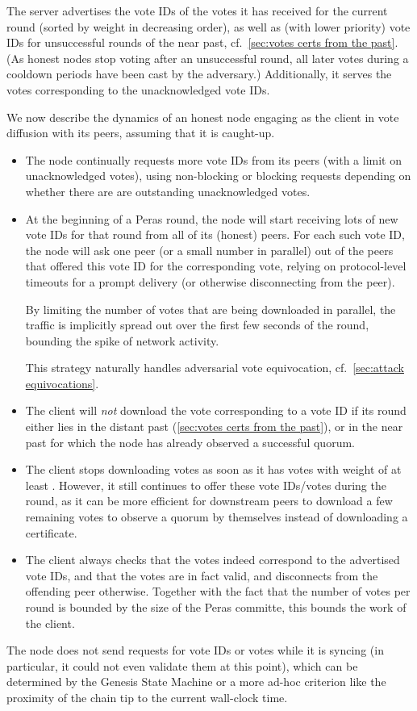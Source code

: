 The server advertises the vote IDs of the votes it has received for the current round (sorted by weight in decreasing order), as well as (with lower priority) vote IDs for unsuccessful rounds of the near past, cf.~\cref{sec:votes certs from the past}.
(As honest nodes stop voting after an unsuccessful round, all later votes during a cooldown periods have been cast by the adversary.)
Additionally, it serves the votes corresponding to the unacknowledged vote IDs.

We now describe the dynamics of an honest node engaging as the client in vote diffusion with its peers, assuming that it is caught-up.
\begin{itemize}
\item
  The node continually requests more vote IDs from its peers (with a limit on unacknowledged votes), using non-blocking or blocking requests depending on whether there are are outstanding unacknowledged votes.
\item
  At the beginning of a Peras round, the node will start receiving lots of new vote IDs for that round from all of its (honest) peers.
  For each such vote ID, the node will ask one peer (or a small number in parallel) out of the peers that offered this vote ID for the corresponding vote, relying on protocol-level timeouts for a prompt delivery (or otherwise disconnecting from the peer).

  By limiting the number of votes that are being downloaded in parallel, the traffic is implicitly spread out over the first few seconds of the round, bounding the spike of network activity.

  This strategy naturally handles adversarial vote equivocation, cf.~\cref{sec:attack equivocations}.
\item
  The client will \emph{not} download the vote corresponding to a vote ID if its round either lies in the distant past (\cref{sec:votes certs from the past}), or in the near past for which the node has already observed a successful quorum.
\item
  The client stops downloading votes as soon as it has votes with weight of at least \perasQuorum{}.
  However, it still continues to offer these vote IDs/votes during the round, as it can be more efficient for downstream peers to download a few remaining votes to observe a quorum by themselves instead of downloading a certificate.
\item
  The client always checks that the votes indeed correspond to the advertised vote IDs, and that the votes are in fact valid, and disconnects from the offending peer otherwise.
  Together with the fact that the number of votes per round is bounded by the size of the Peras committe, this bounds the work of the client.
\end{itemize}
The node does not send requests for vote IDs or votes while it is syncing (in particular, it could not even validate them at this point), which can be determined by the Genesis State Machine \parencite{genesis-implementation-documentation} or a more ad-hoc criterion like the proximity of the chain tip to the current wall-clock time.

